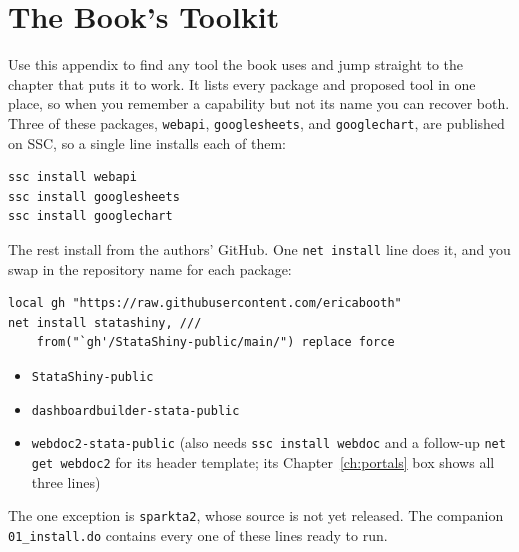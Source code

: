 \documentclass[
    a4paper,
    fontsize=10pt,
    twoside=true,
    numbers=noenddot,
]{kaobook}
\begin{document}
\chapter{The Book's Toolkit}\label{app:toolkit}
Use this appendix to find any tool the book uses and jump straight to the chapter that puts it to work. It lists every package and proposed tool in one place, so when you remember a capability but not its name you can recover both. Three of these packages, \texttt{webapi}, \texttt{googlesheets}, and \texttt{googlechart}, are published on SSC, so a single line installs each of them:
\par
{\footnotesize
\begin{verbatim}
ssc install webapi
ssc install googlesheets
ssc install googlechart
\end{verbatim}
}
The rest install from the authors' GitHub. One \texttt{net install} line does it, and you swap in the repository name for each package:
\par
{\footnotesize
\begin{verbatim}
local gh "https://raw.githubusercontent.com/ericabooth"
net install statashiny, ///
    from("`gh'/StataShiny-public/main/") replace force
\end{verbatim}
}
\begin{itemize}
    \item \texttt{StataShiny-public}
    \item \texttt{dashboardbuilder-stata-public}
    \item \texttt{webdoc2-stata-public} (also needs \texttt{ssc install webdoc} and a follow-up \texttt{net get webdoc2} for its header template; its Chapter~\ref{ch:portals} box shows all three lines)
\end{itemize}
The one exception is \texttt{sparkta2}, whose source is not yet released. The companion \texttt{01\_install.do} contains every one of these lines ready to run.
\end{document}
